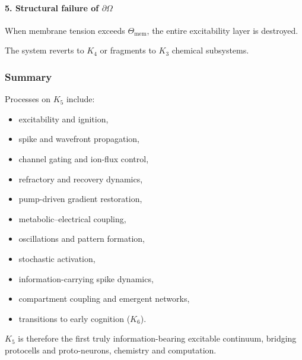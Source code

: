 \paragraph{5. Structural failure of \texorpdfstring{$\partial\Omega$}{\partial\Omega}}
When membrane tension exceeds $\Theta_{\text{mem}}$,
the entire excitability layer is destroyed.

The system reverts to $K_4$ or fragments to $K_3$ chemical subsystems.

\subsubsection{Summary}

Processes on $K_5$ include:
\begin{itemize}
    \item excitability and ignition,
    \item spike and wavefront propagation,
    \item channel gating and ion-flux control,
    \item refractory and recovery dynamics,
    \item pump-driven gradient restoration,
    \item metabolic–electrical coupling,
    \item oscillations and pattern formation,
    \item stochastic activation,
    \item information-carrying spike dynamics,
    \item compartment coupling and emergent networks,
    \item transitions to early cognition ($K_6$).
\end{itemize}

$K_5$ is therefore the first truly information-bearing excitable
continuum, bridging protocells and proto-neurons, chemistry and
computation.
